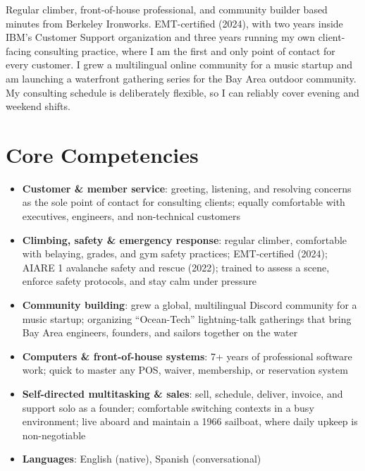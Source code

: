 \documentclass[11pt,a4paper,sans]{moderncv}
\begin{document}
\makecvtitle


\vspace{6pt}
\small{Regular climber, front-of-house professional, and community builder based minutes from Berkeley Ironworks. EMT-certified (2024), with two years inside IBM's Customer Support organization and three years running my own client-facing consulting practice, where I am the first and only point of contact for every customer. I grew a multilingual online community for a music startup and am launching a waterfront gathering series for the Bay Area outdoor community. My consulting schedule is deliberately flexible, so I can reliably cover evening and weekend shifts.}


\section{Core Competencies}
\vspace{1pt}
\begin{itemize}

\item \textbf{Customer \& member service}: greeting, listening, and resolving concerns as the sole point of contact for consulting clients; equally comfortable with executives, engineers, and non-technical customers

\item \textbf{Climbing, safety \& emergency response}: regular climber, comfortable with belaying, grades, and gym safety practices; EMT-certified (2024); AIARE 1 avalanche safety and rescue (2022); trained to assess a scene, enforce safety protocols, and stay calm under pressure

\item \textbf{Community building}: grew a global, multilingual Discord community for a music startup; organizing ``Ocean-Tech'' lightning-talk gatherings that bring Bay Area engineers, founders, and sailors together on the water

\item \textbf{Computers \& front-of-house systems}: 7+ years of professional software work; quick to master any POS, waiver, membership, or reservation system

\item \textbf{Self-directed multitasking \& sales}: sell, schedule, deliver, invoice, and support solo as a founder; comfortable switching contexts in a busy environment; live aboard and maintain a 1966 sailboat, where daily upkeep is non-negotiable

\item \textbf{Languages}: English (native), Spanish (conversational)

\end{itemize}
\end{document}
